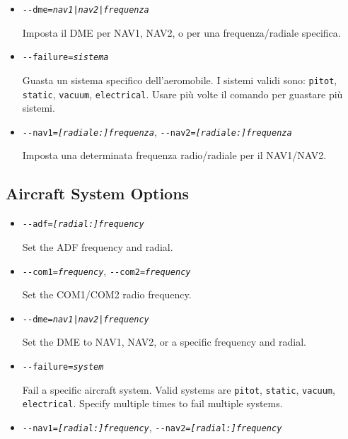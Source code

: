 \begin{itemize}
{\begin{itemize}
  Imposta la frequenza radio COM1/COM2.

  \item{\texttt{-$ $-dme={\it {nav1|nav2|frequenza}}}}

  Imposta il DME per NAV1, NAV2, o per una frequenza/radiale specifica.

  \item{\texttt{-$ $-failure={\it sistema}}}

  Guasta un sistema specifico dell'aeromobile. I sistemi validi sono: \texttt{pitot}, \texttt{static},
  \texttt{vacuum}, \texttt{electrical}. Usare pi\`{u} volte il comando per guastare pi\`{u} sistemi.

  \item{\texttt{-$ $-nav1={\it [radiale:]frequenza}}, \texttt{-$ $-nav2={\it [radiale:]frequenza}}}

  Imposta una determinata frequenza radio/radiale per il NAV1/NAV2.

  \end{itemize}
}
{
  \subsection{Aircraft System Options}
  \begin{itemize}
  \item{\texttt{-$ $-adf={\it [radial:]frequency}}}

  Set the ADF frequency and radial.

  \item{\texttt{-$ $-com1={\it frequency}}, \texttt{-$ $-com2={\it frequency}}}

  Set the COM1/COM2 radio frequency.

  \item{\texttt{-$ $-dme={\it {nav1|nav2|frequency}}}}

  Set the DME to NAV1, NAV2, or a specific frequency and radial.

  \item{\texttt{-$ $-failure={\it system}}}

  Fail a specific aircraft system. Valid systems are \texttt{pitot}, \texttt{static},
  \texttt{vacuum}, \texttt{electrical}. Specify multiple times to fail multiple systems.

  \item{\texttt{-$ $-nav1={\it [radial:]frequency}}, \texttt{-$ $-nav2={\it [radial:]frequency}}}


\end{itemize}}
\end{itemize}

